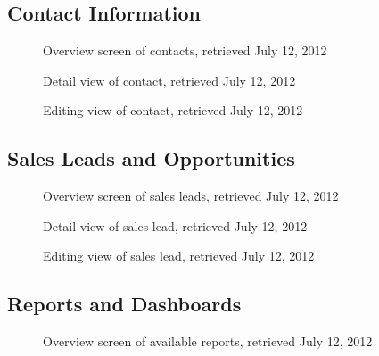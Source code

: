 \FloatBarrier
\subsection{Contact Information}
\begin{figure}[htbp]
	\centering
	\caption[SugarCRM: Overview screen of contacts]{Overview screen of contacts, retrieved July 12, 2012}
\end{figure}

\begin{figure}[htbp]
	\centering
	\caption[SugarCRM: Detail view of contact]{Detail view of contact, retrieved July 12, 2012}
\end{figure}

\begin{figure}[htbp]
	\centering
	\caption[SugarCRM: Editing view of contact]{Editing view of contact, retrieved July 12, 2012}
\end{figure}

\FloatBarrier
\subsection{Sales Leads and Opportunities}
\begin{figure}[htbp]
	\centering
	\caption[SugarCRM: Overview screen of sales leads]{Overview screen of sales leads, retrieved July 12, 2012}
\end{figure}

\begin{figure}[htbp]
	\centering
	\caption[SugarCRM: Detail view of sales lead]{Detail view of sales lead, retrieved July 12, 2012}
\end{figure}

\begin{figure}[htbp]
	\centering
	\caption[SugarCRM: Editing view of sales lead]{Editing view of sales lead, retrieved July 12, 2012}
\end{figure}

\FloatBarrier
\subsection{Reports and Dashboards}
\begin{figure}[htbp]
	\centering
	\caption[SugarCRM: Overview screen of available reports]{Overview screen of available reports, retrieved July 12, 2012}
\end{figure}

